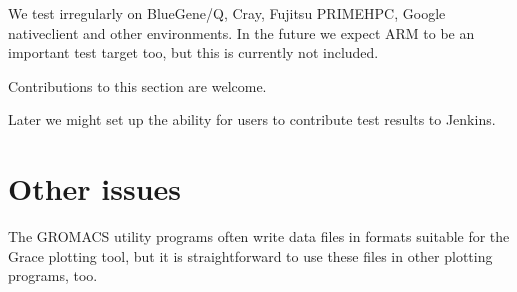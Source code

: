 \documentclass{article}[12pt,a4paper,twoside]
\newcommand{\gromacs}{GROMACS}
\newcommand{\grace}{Grace}
\begin{document}
We test irregularly on BlueGene/Q, Cray,
Fujitsu PRIMEHPC, Google nativeclient and other environments. In 
the future we expect ARM to be an important test target too, but this
is currently not included.

Contributions to this section are welcome.

Later we might set up the ability for users to contribute test results
to Jenkins.

\section{Other issues}

The \gromacs{} utility programs often write data files in formats
suitable for the \grace{} plotting tool, but it is straightforward to
use these files in other plotting programs, too.
\end{document}

